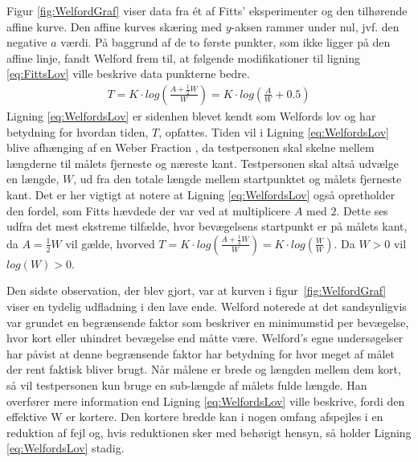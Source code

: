 Figur \ref{fig:WelfordGraf} viser data fra ét af Fitts' eksperimenter og den tilhørende affine kurve. Den affine kurves skæring med $y$-aksen rammer under nul, jvf. den negative $a$ værdi. På baggrund af de to første punkter, som ikke ligger på den affine linje, fandt Welford frem til, at følgende modifikationer til ligning \ref{eq:FittsLov} ville beskrive data punkterne bedre.
\begin{align}\label{eq:WelfordsLov}
T = K \cdot log\left(\frac{A + \frac{1}{2}W}{W}\right) = K \cdot log\left(\frac{A}{W} + 0.5\right)
\end{align}
Ligning \ref{eq:WelfordsLov} er sidenhen blevet kendt som Welfords lov og har betydning for hvordan tiden, $T$, opfattes. Tiden vil i Ligning \ref{eq:WelfordsLov} blive afhænging af en Weber Fraction \cite{welford1958}, da testpersonen skal skelne mellem længderne til målets fjerneste og næreste kant. Testpersonen skal altså udvælge en længde, $W$, ud fra den totale længde mellem startpunktet og målets fjerneste kant. Det er her vigtigt at notere at Ligning \ref{eq:WelfordsLov} også opretholder den fordel, som Fitts hævdede der var ved at multiplicere $A$ med $2$. Dette ses udfra det mest ekstreme tilfælde, hvor bevægelsens startpunkt er på målets kant, da $A = \frac{1}{2}W$ vil gælde, hvorved $T = K \cdot log\left(\frac{A + \frac{1}{2}W}{W}\right) = K \cdot log\left(\frac{W}{W}\right)$. Da $W > 0$ vil $log(W) > 0$.

Den sidste observation, der blev gjort, var at kurven i figur~\ref{fig:WelfordGraf} viser en tydelig udfladning i den lave ende. Welford noterede at det sandsynligvis var grundet en begrænsende faktor som beskriver en minimumstid per bevægelse, hvor kort eller uhindret bevægelse end måtte være. Welford's egne undersøgelser har påvist at denne begrænsende faktor har betydning for hvor meget af målet der rent faktisk bliver brugt. Når målene er brede og længden mellem dem kort, så vil testpersonen kun bruge en sub-længde af målets fulde længde. Han overfører mere information end Ligning \ref{eq:WelfordsLov} ville beskrive, fordi den effektive W er kortere. Den kortere bredde kan i nogen omfang afspejles i en reduktion af fejl og, hvis reduktionen sker med behørigt hensyn, så holder Ligning \ref{eq:WelfordsLov} stadig.

